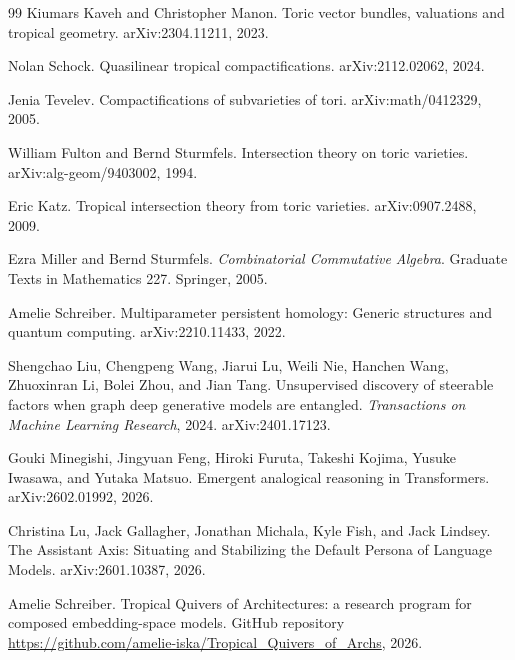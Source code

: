 \documentclass[11pt]{article}
\theoremstyle{definition}
\theoremstyle{plain}
\theoremstyle{remark}
\numberwithin{equation}{section}
\begin{document}
\begin{thebibliography}{99}
Kiumars Kaveh and Christopher Manon.
\newblock Toric vector bundles, valuations and tropical geometry.
\newblock arXiv:2304.11211, 2023.

Nolan Schock.
\newblock Quasilinear tropical compactifications.
\newblock arXiv:2112.02062, 2024.

Jenia Tevelev.
\newblock Compactifications of subvarieties of tori.
\newblock arXiv:math/0412329, 2005.

William Fulton and Bernd Sturmfels.
\newblock Intersection theory on toric varieties.
\newblock arXiv:alg-geom/9403002, 1994.

Eric Katz.
\newblock Tropical intersection theory from toric varieties.
\newblock arXiv:0907.2488, 2009.

Ezra Miller and Bernd Sturmfels.
\newblock \emph{Combinatorial Commutative Algebra}.
\newblock Graduate Texts in Mathematics 227. Springer, 2005.

Amelie Schreiber.
\newblock Multiparameter persistent homology: Generic structures and quantum computing.
\newblock arXiv:2210.11433, 2022.

Shengchao Liu, Chengpeng Wang, Jiarui Lu, Weili Nie, Hanchen Wang, Zhuoxinran Li, Bolei Zhou, and Jian Tang.
\newblock Unsupervised discovery of steerable factors when graph deep generative models are entangled.
\newblock \emph{Transactions on Machine Learning Research}, 2024. arXiv:2401.17123.

Gouki Minegishi, Jingyuan Feng, Hiroki Furuta, Takeshi Kojima, Yusuke Iwasawa, and Yutaka Matsuo.
\newblock Emergent analogical reasoning in Transformers.
\newblock arXiv:2602.01992, 2026.

Christina Lu, Jack Gallagher, Jonathan Michala, Kyle Fish, and Jack Lindsey.
\newblock The Assistant Axis: Situating and Stabilizing the Default Persona of Language Models.
\newblock arXiv:2601.10387, 2026.

Amelie Schreiber.
\newblock Tropical Quivers of Architectures: a research program for composed embedding-space models.
\newblock GitHub repository \url{https://github.com/amelie-iska/Tropical_Quivers_of_Archs}, 2026.


\end{thebibliography}
\end{document}
